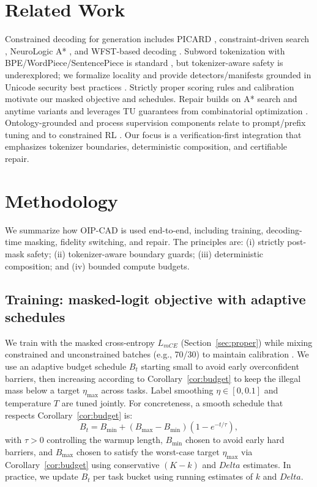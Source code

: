 \documentclass{article}
\def\Delta{Delta}%
\def\mathcal#1{#1}%
\def\mathrm#1{#1}%
\def\;{ }%
\begin{document}
\section{Related Work}\label{sec:related}
Constrained decoding for generation includes PICARD \cite{scholak2021picard}, constraint-driven search \cite{lu2010grid}, NeuroLogic A* \cite{lu2021neurologic}, and WFST-based decoding \cite{mohri2002weighted}. Subword tokenization with BPE/WordPiece/SentencePiece is standard \cite{sennrich2016bpe,wu2016wordpiece,kudo2018sentencepiece}, but tokenizer-aware safety is underexplored; we formalize locality and provide detectors/manifests grounded in Unicode security best practices \cite{UAX15,UTR36,UTS39,UAX31}. Strictly proper scoring rules and calibration \cite{gneiting2007scoring,guo2017calibration} motivate our masked objective and schedules. Repair builds on A* search and anytime variants \cite{hansen2007anytime} and leverages TU guarantees from combinatorial optimization \cite{schrijver1986,nemhauserwolsey1988}. Ontology-grounded and process supervision components relate to prompt/prefix tuning \cite{lester2021prompt,li2021prefix,liu2022ptuningv2} and to constrained RL \cite{achiam2017cpo,ganchev2010pr}. Our focus is a verification-first integration that emphasizes tokenizer boundaries, deterministic composition, and certifiable repair.

\section{Methodology}\label{sec:method}
We summarize how OIP-CAD is used end-to-end, including training, decoding-time masking, fidelity switching, and repair. The principles are: (i) strictly post-mask safety; (ii) tokenizer-aware boundary guards; (iii) deterministic composition; and (iv) bounded compute budgets.

\subsection{Training: masked-logit objective with adaptive schedules}
We train with the masked cross-entropy $\mathcal{L}_{\mathrm{mCE}}$ (Section~\ref{sec:proper}) while mixing constrained and unconstrained batches (e.g., 70/30) to maintain calibration \cite{guo2017calibration}. We use an adaptive budget schedule $B_t$ starting small to avoid early overconfident barriers, then increasing according to Corollary~\ref{cor:budget} to keep the illegal mass below a target $\eta_{\max}$ across tasks. Label smoothing $\eta\in[0,0.1]$ and temperature $T$ are tuned jointly. For concreteness, a smooth schedule that respects Corollary~\ref{cor:budget} is:
\begin{equation}\label{eq:schedule}
B_t \;=\; B_{\min} + (B_{\max}-B_{\min})\left(1 - e^{-t/\tau}\right),
\end{equation}
with $\tau>0$ controlling the warmup length, $B_{\min}$ chosen to avoid early hard barriers, and $B_{\max}$ chosen to satisfy the worst-case target $\eta_{\max}$ via Corollary~\ref{cor:budget} using conservative $(K{-}k)$ and $\Delta$ estimates. In practice, we update $B_t$ per task bucket using running estimates of $k$ and $\Delta$.
\end{document}
